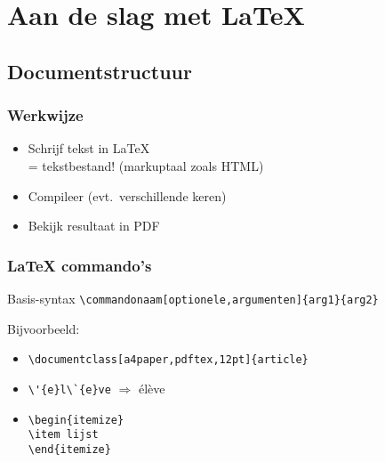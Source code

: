 \documentclass[aspectratio=169]{beamer}
\begin{document}
\section{Aan de slag met {\LaTeX}}

\subsection{Documentstructuur}

\begin{frame}
  \frametitle{Werkwijze}

  \begin{itemize}
    \item<+-> Schrijf tekst in {\LaTeX}\\
    = tekstbestand! (markuptaal zoals HTML)
    \item<+-> Compileer (evt.\ verschillende keren)
    \item<+-> Bekijk resultaat in PDF
  \end{itemize}
\end{frame}

\begin{frame}[fragile]
  \frametitle{{\LaTeX} commando's}

  \begin{block}{Basis-syntax}
    \verb|\commandonaam[optionele,argumenten]{arg1}{arg2}|
  \end{block}

  \pause

  Bijvoorbeeld:

  \begin{itemize}
    \item<+-> \verb|\documentclass[a4paper,pdftex,12pt]{article}|
    \item<+-> \verb|\'{e}l\`{e}ve| \(\Rightarrow\) \'el\`eve
    \item<+-> \verb|\begin{itemize}|\\
    \verb|\item lijst|\\
    \verb|\end{itemize}|
  \end{itemize}

\end{frame}
\end{document}
